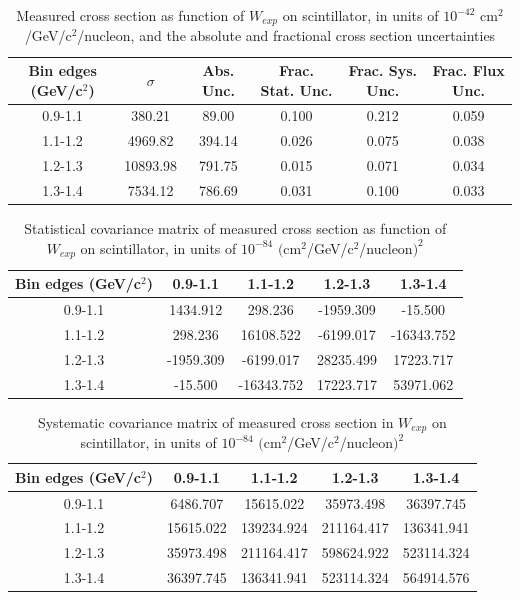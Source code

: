 \documentclass[../main.tex]{subfiles}
\begin{document}
\pagebreak
\begin{turnpage}
\end{turnpage}
\begin{table}
  \centering
  \renewcommand{\arraystretch}{1.15}
  \caption{Measured cross section as function of $W_{exp}$ on scintillator, in units of $10^{-42}$ $\text{cm}^2$/GeV/c${}^2$/nucleon, and the absolute and fractional cross section uncertainties}
    \begin{tabular}{c||c|c||c|c|c}
      Bin edges (GeV/c${}^2$) &  $\sigma$  &  Abs. Unc.  &  Frac. Stat. Unc.  &  Frac. Sys. Unc.  &  Frac. Flux Unc. \\
      \hline
      \hline
      0.9-1.1 & 380.21 & 89.00 & 0.100 & 0.212 & 0.059\\
      1.1-1.2 & 4969.82 & 394.14 & 0.026 & 0.075 & 0.038\\
      1.2-1.3 & 10893.98 & 791.75 & 0.015 & 0.071 & 0.034\\
      1.3-1.4 & 7534.12 & 786.69 & 0.031 & 0.100 & 0.033
    \end{tabular}
  \label{tbl:datanucleonplasticWa}
\end{table}
\begin{table}
  \centering
  \renewcommand{\arraystretch}{1.15}
  \caption{Statistical covariance matrix of measured cross section as function of $W_{exp}$ on scintillator, in units of $10^{-84}$ $(\text{cm}^2$/GeV/c${}^2$/nucleon$)^2$}
    \begin{tabular}{c||cccc}
      Bin edges (GeV/c${}^2$) & 0.9-1.1 & 1.1-1.2 & 1.2-1.3 & 1.3-1.4\\
      \hline
      \hline
      0.9-1.1 & 1434.912 & 298.236 & -1959.309 & -15.500\\
      1.1-1.2 & 298.236 & 16108.522 & -6199.017 & -16343.752\\
      1.2-1.3 & -1959.309 & -6199.017 & 28235.499 & 17223.717\\
      1.3-1.4 & -15.500 & -16343.752 & 17223.717 & 53971.062
    \end{tabular}
  \label{tbl:statnucleonplasticWb}
\end{table}
\begin{table}
  \centering
  \renewcommand{\arraystretch}{1.15}
  \caption{Systematic covariance matrix of measured cross section in $W_{exp}$ on scintillator, in units of $10^{-84}$ $(\text{cm}^2$/GeV/c${}^2$/nucleon$)^2$}
    \begin{tabular}{c||cccc}
      Bin edges (GeV/c${}^2$) & 0.9-1.1 & 1.1-1.2 & 1.2-1.3 & 1.3-1.4\\
      \hline
      \hline
      0.9-1.1 & 6486.707 & 15615.022 & 35973.498 & 36397.745\\
      1.1-1.2 & 15615.022 & 139234.924 & 211164.417 & 136341.941\\
      1.2-1.3 & 35973.498 & 211164.417 & 598624.922 & 523114.324\\
      1.3-1.4 & 36397.745 & 136341.941 & 523114.324 & 564914.576
    \end{tabular}
  \label{tbl:sysnucleonplasticWc}
\end{table}
\end{document}
